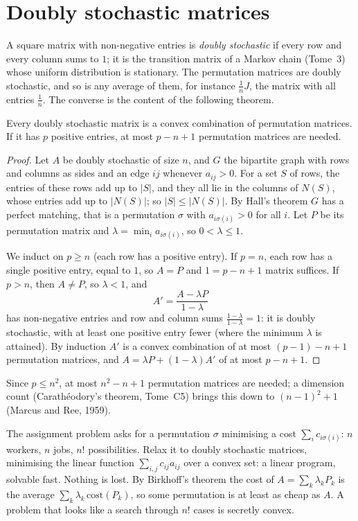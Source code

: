 \section{Doubly stochastic matrices}

A square matrix with non-negative entries is \emph{doubly stochastic} if every row and every column sums to $1$; it is the transition
matrix of a Markov chain (Tome~3) whose uniform distribution is stationary. The permutation matrices are doubly stochastic, and so
is any average of them, for instance $\frac1n J$, the matrix with all entries $\frac1n$. The converse is the content of the following theorem.

\begin{theorem}\label{thm:birkhoff}
Every doubly stochastic matrix is a convex combination of permutation matrices. If it has $p$ positive entries, at most
$p-n+1$ permutation matrices are needed.
\end{theorem}
\begin{proof}
Let $A$ be doubly stochastic of size $n$, and $G$ the bipartite graph with rows and columns as sides and an edge $ij$ whenever $a_{ij}>0$.
For a set $S$ of rows, the entries of these rows add up to $|S|$, and they all lie in the columns of $N(S)$, whose entries add up to $|N(S)|$;
so $|S|\le|N(S)|$. By Hall's theorem $G$ has a perfect matching, that is a permutation $\sigma$ with $a_{i\sigma(i)}>0$ for all $i$. Let $P$ be its
permutation matrix and $\lambda=\min_ia_{i\sigma(i)}$, so $0<\lambda\le1$.

We induct on $p\ge n$ (each row has a positive entry). If $p=n$, each row has a single positive entry, equal to $1$, so $A=P$ and
$1=p-n+1$ matrix suffices. If $p>n$, then $A\ne P$, so $\lambda<1$, and
\[
A'=\frac{A-\lambda P}{1-\lambda}
\]
has non-negative entries and row and column sums $\frac{1-\lambda}{1-\lambda}=1$: it is doubly stochastic, with at least one positive entry fewer
(where the minimum $\lambda$ is attained). By induction $A'$ is a convex combination of at most $(p-1)-n+1$ permutation matrices,
and $A=\lambda P+(1-\lambda)A'$ of at most $p-n+1$.
\end{proof}

Since $p\le n^2$, at most $n^2-n+1$ permutation matrices are needed; a dimension count (Carath\'eodory's theorem, Tome~C5) brings this down
to $(n-1)^2+1$ (Marcus and Ree, 1959).

\begin{beauty}
The assignment problem asks for a permutation $\sigma$ minimising a cost $\sum_ic_{i\sigma(i)}$: $n$ workers, $n$ jobs, $n!$ possibilities.
Relax it to doubly stochastic matrices, minimising the linear function $\sum_{i,j}c_{ij}a_{ij}$ over a convex set: a linear program,
solvable fast. Nothing is lost. By Birkhoff's theorem the cost of $A=\sum_k\lambda_kP_k$ is the average $\sum_k\lambda_k\,\mathrm{cost}(P_k)$,
so some permutation is at least as cheap as $A$. A problem that looks like a search through $n!$ cases is secretly convex.
\end{beauty}

